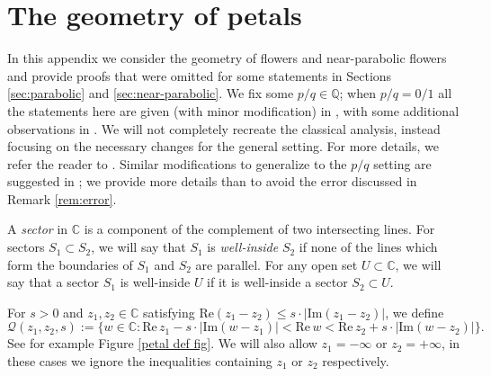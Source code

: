\documentclass[12pt,letterpaper]{amsart}
\numberwithin{equation}{section}
\theoremstyle{remark}
\theoremstyle{definition}
\newcommand{\C}{\mathbb C}
\newcommand{\Q}{\mathbb Q}
\newcommand{\QQ}{\mathcal Q}
\begin{document}
\appendix


	\section{The geometry of petals}
	
	
	In this appendix we consider the geometry of  flowers and near-parabolic flowers and provide  proofs that were omitted for some statements in Sections \ref{sec:parabolic} and \ref{sec:near-parabolic}. We fix some $p/q\in \Q$; when $p/q= 0/1$ all the statements here are given (with minor modification) in \cite{shishikura_1}, with some additional observations in \cite{positive_area}. We will not completely recreate the classical analysis, instead focusing on the necessary changes for the general setting. For more details, we refer the reader to \cite{shishikura_1}. Similar modifications  to generalize to the  $p/q$ setting are suggested in \cite[\S 7]{shishikura_boundary}; we provide more details than \cite[\S 7]{shishikura_boundary} to avoid the error discussed in Remark \ref{rem:error}.
	
	
	A \textit{sector} in $\C$ is a component of the complement of two intersecting lines. For sectors $S_1\subset S_2$, we will say that $S_1$ is \textit{well-inside} $S_2$ if none of the lines which form the boundaries of $S_1$ and $S_2$ are parallel. For any open set $U\subset \C$, we will say that a sector $S_1$ is well-inside $U$ if it is well-inside a sector $S_2\subset U$.
	
	
	For $s>0$ and $z_1, z_2\in \C$ satisfying $\text{Re}(z_1-z_2)\leq s\cdot |\text{Im}(z_1-z_2)|$, we define
	$$\QQ(z_1, z_2, s):= \{w\in \C: \text{Re}\,z_1- s\cdot|\text{Im}(w-z_1)|< \text{Re}\,w< \text{Re}\,z_2+s\cdot|\text{Im}(w-z_2)|\}.$$
	See for example Figure \ref{petal def fig}.
	We will also allow $z_1=-\infty$ or $z_2=+\infty$, in these cases we ignore the inequalities containing $z_1$ or $z_2$ respectively. 
	
\end{document}
